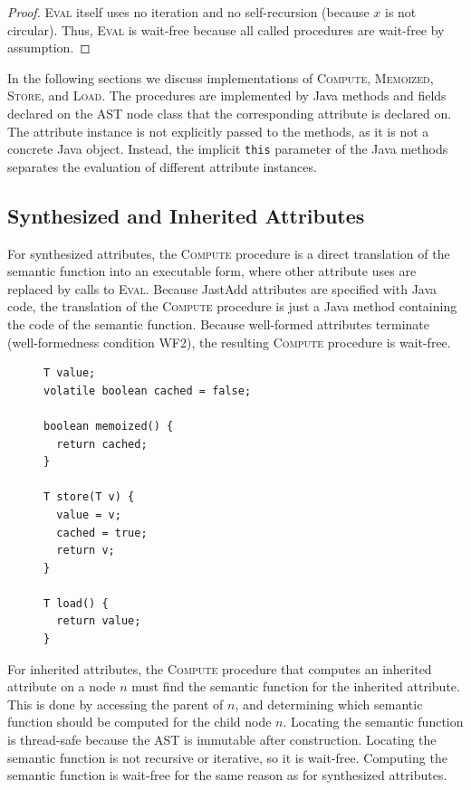 {\begin{theorem}
  \label{theorem:eval-wait-free}
\end{theorem}

\begin{proof}
  \textsc{Eval} itself uses no iteration and no
  self-recursion (because $x$ is not circular).
  Thus, \textsc{Eval} is wait-free because all called procedures are wait-free by assumption.
\end{proof}

In the following sections we discuss implementations of \textsc{Compute},
\textsc{Memoized}, \textsc{Store}, and \textsc{Load}.
The procedures are implemented by Java methods and fields declared on the AST node class that
the corresponding attribute is declared on.
The attribute instance is not explicitly
passed to the methods, as it is not a concrete Java object.
Instead, the implicit \verb'this' parameter of the Java methods separates the
evaluation of different attribute instances.


\subsection{Synthesized and Inherited Attributes}
\label{syn-compute}

For synthesized attributes, the \textsc{Compute} procedure is a direct translation of
the semantic function into an executable form, where other attribute uses are replaced
by calls to \textsc{Eval}.  Because JastAdd attributes are specified with
Java code, the translation of the \textsc{Compute} procedure is just a Java method containing
the code of the semantic function.
Because well-formed attributes terminate (well-formedness condition WF2),
the resulting \textsc{Compute} procedure is wait-free.


\begin{figure}
\begin{lstlisting}[label={lst:syn-impl},
  caption={Memoization in Java for simple attributes.}]
T value;
volatile boolean cached = false;

boolean memoized() {
  return cached;
}

T store(T v) {
  value = v;
  cached = true;
  return v;
}

T load() {
  return value;
}
\end{lstlisting}
\end{figure}

For inherited attributes, the \textsc{Compute} procedure
that computes an inherited attribute on a node $n$ must
find the semantic function for the inherited attribute.  This is
done by accessing the parent of $n$, and determining which semantic function should
be computed for the child node $n$.
Locating the semantic function is thread-safe because the AST is immutable after construction.
Locating the semantic function is not recursive or iterative, so it is wait-free.
Computing the semantic function is wait-free for the same reason as for synthesized attributes.

}
